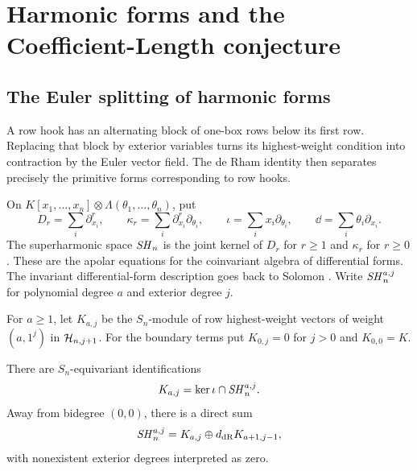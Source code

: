 \section{Harmonic forms and the Coefficient-Length conjecture}
\label{sec:length}

\subsection{The Euler splitting of harmonic forms}

A row hook has an alternating block of one-box rows below its first
row.  Replacing that block by exterior variables turns its
highest-weight condition into contraction by the Euler vector
field.  The de Rham identity then separates precisely the primitive
forms corresponding to row hooks.

On $K[x_1,\ldots,x_n]\otimes\Lambda(\theta_1,\ldots,\theta_n)$,
put
\[
 D_r=\sum_i\partial_{x_i}^r,\qquad
 \kappa_r=\sum_i\partial_{x_i}^r\partial_{\theta_i},
 \qquad
 \iota=\sum_i x_i\partial_{\theta_i},\qquad
 \dd=\sum_i\theta_i\partial_{x_i}.
\]
The superharmonic space $\mathit{SH}_n$ is the joint kernel of $D_r$
for $r\geq1$ and $\kappa_r$ for $r\geq0$.
These are the apolar equations for the coinvariant algebra
of differential forms.  The invariant differential-form
description goes back to Solomon \cite{Solomon}.
Write $\mathit{SH}_n^{a,j}$ for polynomial degree $a$ and exterior
degree $j$.

For $a\geq1$, let $K_{a,j}$ be the $S_n$-module of row
highest-weight vectors of weight $(a,1^j)$ in
$\mathcal H_{n,j+1}$.  For the boundary terms put
$K_{0,j}=0$ for $j>0$ and $K_{0,0}=K$.

\begin{lemma}\label{lem:hook-bridge}
There are $S_n$-equivariant identifications
\begin{equation}\label{eq:hook-bridge}
 K_{a,j}=\ker\iota\cap\mathit{SH}_n^{a,j}.
\end{equation}
Away from bidegree $(0,0)$, there is a direct sum
\begin{equation}\label{eq:euler-splitting}
 \mathit{SH}_n^{a,j}=K_{a,j}\oplus d_{\mathrm{dR}} K_{a+1,j-1},
\end{equation}
with nonexistent exterior degrees interpreted as zero.
\end{lemma}

